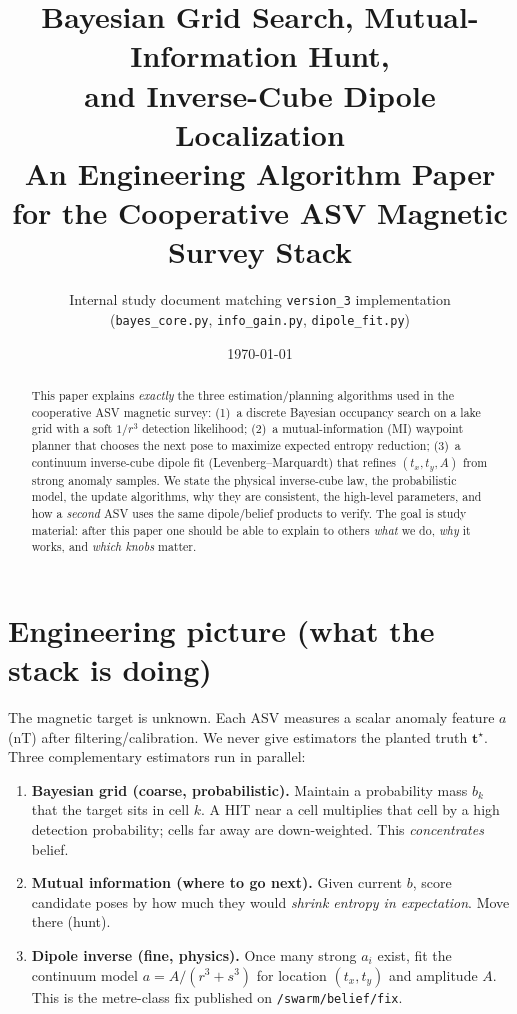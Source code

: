 \documentclass[11pt,a4paper]{article}
\title{\textbf{Bayesian Grid Search, Mutual-Information Hunt,\\
and Inverse-Cube Dipole Localization}\\[0.4em]
\large An Engineering Algorithm Paper for the Cooperative ASV Magnetic Survey Stack}
\author{Internal study document matching \texttt{version\_3} implementation\\
(\texttt{bayes\_core.py}, \texttt{info\_gain.py}, \texttt{dipole\_fit.py})}
\date{\today}
\begin{document}
\maketitle

\begin{abstract}
This paper explains \emph{exactly} the three estimation/planning algorithms used
in the cooperative ASV magnetic survey: (1)~a discrete Bayesian occupancy
search on a lake grid with a soft \(1/r^{3}\) detection likelihood;
(2)~a mutual-information (MI) waypoint planner that chooses the next pose to
maximize expected entropy reduction; (3)~a continuum inverse-cube dipole fit
(Levenberg--Marquardt) that refines \((t_x,t_y,A)\) from strong anomaly samples.
We state the physical inverse-cube law, the probabilistic model, the update
algorithms, why they are consistent, the high-level parameters, and how a
\emph{second} ASV uses the same dipole/belief products to verify. The goal is
study material: after this paper one should be able to explain to others
\emph{what} we do, \emph{why} it works, and \emph{which knobs} matter.
\end{abstract}

\tableofcontents
\vspace{0.6em}

\section{Engineering picture (what the stack is doing)}

The magnetic target is unknown. Each ASV measures a scalar anomaly feature
\(a\) (nT) after filtering/calibration. We never give estimators the planted
truth \(\mathbf{t}^{\star}\). Three complementary estimators run in parallel:

\begin{enumerate}[leftmargin=*]
  \item \textbf{Bayesian grid (coarse, probabilistic).}
        Maintain a probability mass \(b_k\) that the target sits in cell \(k\).
        A HIT near a cell multiplies that cell by a high detection probability;
        cells far away are down-weighted. This \emph{concentrates} belief.
  \item \textbf{Mutual information (where to go next).}
        Given current \(b\), score candidate poses by how much they would
        \emph{shrink entropy in expectation}. Move there (hunt).
  \item \textbf{Dipole inverse (fine, physics).}
        Once many strong \(a_i\) exist, fit the continuum model
        \(a=A/(r^{3}+s^{3})\) for location \((t_x,t_y)\) and amplitude \(A\).
        This is the metre-class fix published on \texttt{/swarm/belief/fix}.
\end{enumerate}
\end{document}
